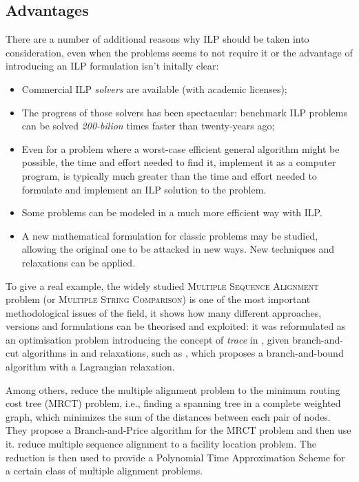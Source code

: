 \subsection{Advantages}

There are a number of additional reasons why ILP should be taken into consideration, even when the problems seems to not require it or the advantage of introducing an ILP formulation isn't initally clear\cite{gusfieldilp}:

\begin{itemize}
	\item Commercial ILP \textit{solvers} are available (with academic licenses);
	\item The progress of those solvers has been spectacular: benchmark ILP problems can be solved \textit{200-bilion} times faster than twenty-years ago;
	\item Even for a problem where a worst-case efficient general algorithm might be possible, the time and effort needed to find it, implement it as a computer program, is typically much greater than the time and effort needed to formulate and implement an ILP solution to the problem.
	\item Some problems can be modeled in a much more efficient way with ILP.
	\item A new mathematical formulation for classic problems may be studied, allowing the original one to be attacked in new ways. New techniques and relaxations can be applied.
\end{itemize}

To give a real example, the widely studied \textsc{Multiple Sequence Alignment} problem \cite{carrillo1988multiple} (or \textsc{Multiple String Comparison}) is one of the most important methodological issues of the field, it shows how many different approaches, versions and formulations can be theorised and exploited: it was reformulated as an optimisation problem introducing the concept of \textit{trace} in \cite{Kececioglu1993}, given branch-and-cut algorithms in \cite{KECECIOGLU2000143} and relaxations, such as \cite{Althaus2007}, which proposes a branch-and-bound algorithm with a Lagrangian relaxation. 

Among others, \cite{NET:NET10022} reduce the multiple alignment problem to the minimum routing cost tree (MRCT) problem, i.e., finding a spanning tree in a complete weighted graph, which minimizes the sum of the distances between each pair of nodes. They propose a Branch-and-Price algorithm for the MRCT problem and then use it. \cite{DBLP:conf/stringology/JustV00} reduce multiple sequence alignment to a facility location problem. The reduction is then used to provide a Polynomial Time Approximation Scheme for a certain class of multiple alignment problems.


